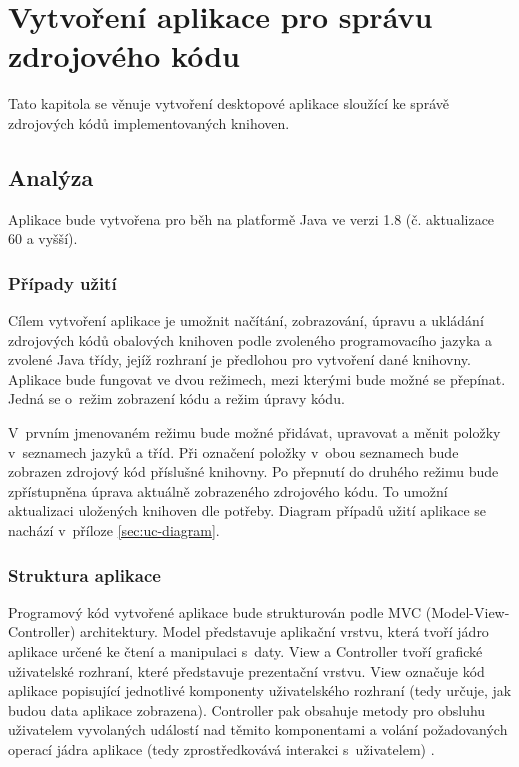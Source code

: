\documentclass[czech,BP]{thesiskiv}
\begin{document}
\chapter{Vytvoření aplikace pro správu zdrojového kódu}
Tato kapitola se věnuje vytvoření desktopové aplikace sloužící ke správě zdrojových kódů implementovaných knihoven.

\section{Analýza}
Aplikace bude vytvořena pro běh na platformě Java ve verzi 1.8 (č. aktualizace 60 a vyšší).

\subsection{Případy užití}
Cílem vytvoření aplikace je umožnit načítání, zobrazování, úpravu a ukládání zdrojových kódů obalových knihoven podle zvoleného programovacího jazyka a zvolené Java třídy, jejíž rozhraní je předlohou pro vytvoření dané knihovny. Aplikace bude fungovat ve dvou režimech, mezi kterými bude možné se přepínat. Jedná se o~režim zobrazení kódu a režim úpravy kódu.\par
V~prvním jmenovaném režimu bude možné přidávat, upravovat a měnit položky v~seznamech jazyků a tříd. Při označení položky v~obou seznamech bude zobrazen zdrojový kód příslušné knihovny. Po přepnutí do druhého režimu bude zpřístupněna úprava aktuálně zobrazeného zdrojového kódu. To umožní aktualizaci uložených knihoven dle potřeby. Diagram případů užití aplikace se nachází v~příloze \ref{sec:uc-diagram}.

\subsection{Struktura aplikace}
Programový kód vytvořené aplikace bude strukturován podle MVC (Model-View-Controller) architektury. Model představuje aplikační vrstvu, která tvoří jádro aplikace určené ke čtení a manipulaci s~daty. View a Controller tvoří grafické uživatelské rozhraní, které představuje prezentační vrstvu. View označuje kód aplikace popisující jednotlivé komponenty uživatelského rozhraní (tedy určuje, jak budou data aplikace zobrazena). Controller pak obsahuje metody pro obsluhu uživatelem vyvolaných událostí nad těmito komponentami a volání požadovaných operací jádra aplikace (tedy zprostředkovává interakci s~uživatelem) \cite{mvc-architecture}.
\end{document}
